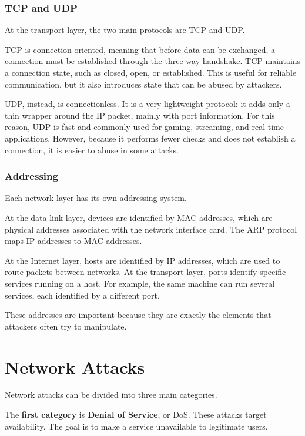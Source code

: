 \documentclass{article}
\begin{document}
\subsubsection{TCP and UDP}

At the transport layer, the two main protocols are TCP and UDP.

TCP is connection-oriented, meaning that before data can be exchanged, a connection must be established through the three-way handshake. TCP maintains a connection state, such as closed, open, or established. This is useful for reliable communication, but it also introduces state that can be abused by attackers.

UDP, instead, is connectionless. It is a very lightweight protocol: it adds only a thin wrapper around the IP packet, mainly with port information. For this reason, UDP is fast and commonly used for gaming, streaming, and real-time applications. However, because it performs fewer checks and does not establish a connection, it is easier to abuse in some attacks.

\subsubsection{Addressing}

Each network layer has its own addressing system.

At the data link layer, devices are identified by MAC addresses, which are physical addresses associated with the network interface card. The ARP protocol maps IP addresses to MAC addresses.

At the Internet layer, hosts are identified by IP addresses, which are used to route packets between networks.
At the transport layer, ports identify specific services running on a host. For example, the same machine can run several services, each identified by a different port.

These addresses are important because they are exactly the elements that attackers often try to manipulate.

\section{Network Attacks}

Network attacks can be divided into three main categories.

The \textbf{first category} is \textbf{Denial of Service}, or DoS. These attacks target availability. The goal is to make a service unavailable to legitimate users.
\end{document}
